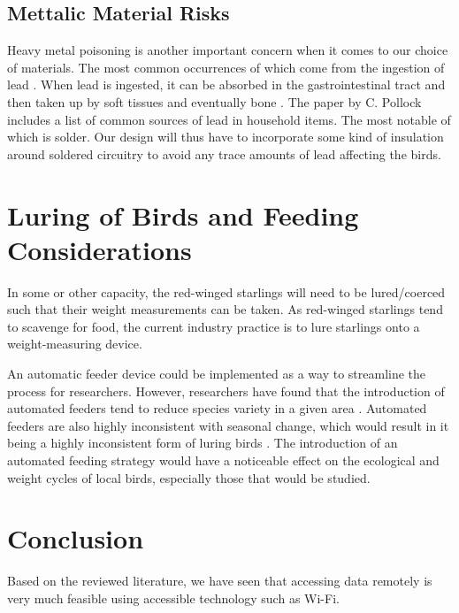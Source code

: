 \documentclass[class=report,11pt,crop=false]{standalone}
\begin{document}
\subsection{Mettalic Material Risks}
Heavy metal poisoning is another important concern when it comes to our choice of materials. The most common occurrences of which come from the ingestion of lead \cite{PollockHeavyMetal}. When lead is ingested, it can be absorbed in the gastrointestinal tract and then taken up by soft tissues and eventually bone \cite{PollockHeavyMetal}. The paper by C. Pollock includes a list of common sources of lead in household items. The most notable of which is solder. Our design will thus have to incorporate some kind of insulation around soldered circuitry to avoid any trace amounts of lead affecting the birds.

\pagebreak
\section{Luring of Birds and Feeding Considerations}

In some or other capacity, the red-winged starlings will need to be lured/coerced such that their weight measurements can be taken. As red-winged starlings tend to scavenge for food, the current industry practice is to lure starlings onto a weight-measuring device. 

An automatic feeder device could be implemented as a way to streamline the process for researchers. However, researchers have found that the introduction of automated feeders tend to reduce species variety in a given area \cite{GalbraithFeeders}. Automated feeders are also highly inconsistent with seasonal change, which would result in it being a highly inconsistent form of luring birds \cite{GalbraithFeeders}. The introduction of an automated feeding strategy would have a noticeable effect on the ecological and weight cycles of local birds, especially those that would be studied.

\section{Conclusion}

Based on the reviewed literature, we have seen that accessing data remotely is very much feasible using accessible technology such as Wi-Fi.


\ifstandalone

\printnoidxglossary[type=\acronymtype,nonumberlist]
\fi
\end{document}
